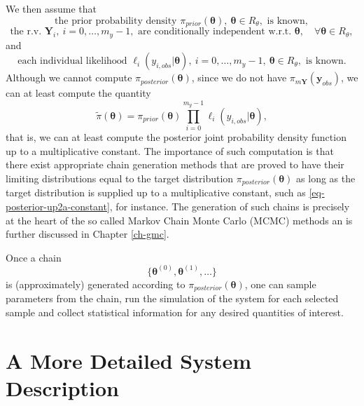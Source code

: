 We then assume that
\begin{equation}\label{eq-hyp-prior-known}
\mbox{the prior probability density }\pi_{prior}(\boldsymbol{\theta}),~\boldsymbol\theta\in R_{\theta},\mbox{ is known},
\end{equation}
\begin{equation}\label{eq-hyp-conditional-independence}
\mbox{the r.v. }\mathbf{Y}_i,~i=0,\ldots,m_y-1,\mbox{ are conditionally independent w.r.t. }\boldsymbol\theta,\quad\forall\boldsymbol\theta\in R_{\theta},
\end{equation}
and
\begin{equation}\label{eq-hyp-l-known}
\mbox{each individual likelihood }\ell_i(y_{i,obs}|\boldsymbol\theta),~i=0,\ldots,m_y-1,~\boldsymbol\theta\in R_{\theta},\mbox{ is known}.
\end{equation}
Although we cannot compute $\pi_{posterior}(\boldsymbol\theta)$,
since we do not have $\pi_{m\mathbf{Y}}(\mathbf{y}_{obs})$,
we can at least compute the quantity
\begin{equation}\label{eq-posterior-up2a-constant}
\tilde{\pi}(\boldsymbol\theta) =
{\pi_{prior}(\boldsymbol\theta)\prod_{i=0}^{m_y-1}\ell_i(y_{i,obs}|\boldsymbol\theta)},
\end{equation}
that is, we can at least compute the posterior joint probability density function up to a multiplicative constant.
The importance of such computation is that there exist
appropriate chain generation methods that are proved to have their limiting distributions equal 
to the target distribution $\pi_{posterior}(\boldsymbol\theta)$ as long as the target distribution is supplied
up to a multiplicative constant, such as \eqref{eq-posterior-up2a-constant}, for instance.
The generation of such chains is precisely at the heart of the so called Markov Chain Monte Carlo (MCMC) methods
an is further discussed in Chapter \ref{ch-gmc}.

Once a chain
\begin{equation}\label{eq-markov-chain}
\{\boldsymbol{\theta}^{(0)},\boldsymbol{\theta}^{(1)},\ldots\}
\end{equation}
is (approximately) generated according to $\pi_{posterior}(\boldsymbol\theta)$, one can
sample parameters from the chain,
run the simulation of the system for each selected sample and
collect statistical information for any desired quantities of interest.

\section{A More Detailed System Description}\label{sc-intro-detail}

